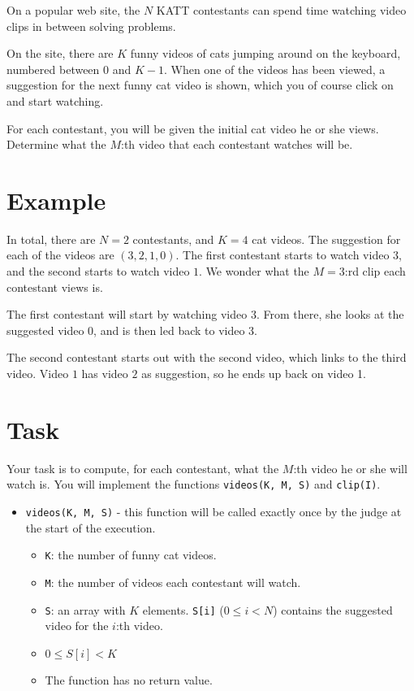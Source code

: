 \newcommand\version{v1}
On a popular web site, the $N$ KATT contestants can spend time watching video clips in between solving problems.

On the site, there are $K$ funny videos of cats jumping around on the keyboard, numbered between $0$ and $K - 1$.
When one of the videos has been viewed, a suggestion for the next funny cat video is shown, which you of course click on and start watching.

For each contestant, you will be given the initial cat video he or she views. Determine what the $M$:th video
that each contestant watches will be.

\section*{Example}
In total, there are $N = 2$ contestants, and $K = 4$ cat videos.
The suggestion for each of the videos are $(3, 2, 1, 0)$. The first contestant starts to watch video $3$, and the second starts to watch video $1$.
We wonder what the $M = 3$:rd clip each contestant views is.

The first contestant will start by watching video 3. From there, she looks at the suggested video 0, and is then led back to video 3.

The second contestant starts out with the second video, which links to the third video. Video $1$ has video $2$ as suggestion, so he ends up back on video 1.

\section*{Task}
Your task is to compute, for each contestant, what the $M$:th video he or she will watch is.
You will implement the functions \texttt{videos(K, M, S)} and \texttt{clip(I)}.

\begin{itemize}
  \item \texttt{videos(K, M, S)} - this function will be called exactly once by the judge at the start of the execution.
  \begin{itemize}
    \item \texttt{K}: the number of funny cat videos.
    \item \texttt{M}: the number of videos each contestant will watch.
    \item \texttt{S}: an array with $K$ elements. \texttt{S[i]} ($0 \le i < N$) contains the suggested video for the $i$:th video.
		\item $0 \le S[i] < K$
		\item The function has no return value.
  \end{itemize}
\end{itemize}

